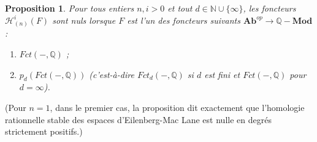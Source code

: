 \documentclass[a4paper,10pt]{article}
\newcommand{\Hh}{{\mathcal{H}}}
\newtheorem{pr}[thm]{Proposition}
\theoremstyle{definition}
\theoremstyle{remark}
\begin{document}
\begin{pr}\label{pz}
Pour tous entiers $n,i>0$ et tout $d\in\mathbb{N}\cup\{\infty\}$, les foncteurs $\Hh_{(n)}^i(F)$ sont nuls lorsque $F$ est l'un des foncteurs suivants $\mathbf{Ab}^{op}\to\mathbb{Q}-\mathbf{Mod}$ :
\begin{enumerate}
 \item $Fct(-,\mathbb{Q})$ ;
\item $p_d(Fct(-,\mathbb{Q}))$ (c'est-à-dire $Fct_d(-,\mathbb{Q})$ si $d$ est fini et $Fct(-,\mathbb{Q})$ pour $d=\infty$).
\end{enumerate}
\end{pr}

(Pour $n=1$, dans le premier cas, la proposition dit exactement que l'homologie rationnelle stable des espaces d'Eilenberg-Mac Lane est nulle en degrés strictement positifs.)
\end{document}
